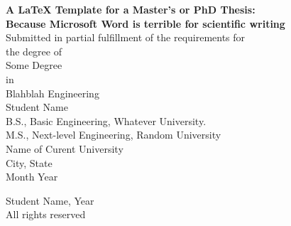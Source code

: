 \thispagestyle{empty}
\begin{center}
\begin{singlespacing}
\vspace*{3\baselineskip}
\textbf{A \LaTeX{}  Template for a Master's or PhD Thesis:\\ \noindent
Because Microsoft Word is terrible for scientific writing\\}
\vspace{4.5\baselineskip}
Submitted in partial fulfillment of the requirements for\\\vspace{0.75\baselineskip}the degree of\\\vspace{0.75\baselineskip}Some Degree\\\vspace{0.75\baselineskip}in\\\vspace{0.75\baselineskip}Blahblah Engineering\\
\vspace{5\baselineskip}
Student Name\\
\vspace{2\baselineskip}
B.S., Basic Engineering, Whatever University.\\
M.S., Next-level Engineering, Random University\\
\vspace{8.5\baselineskip}
Name of Curent University\\
City, State\\
\vspace{\baselineskip}
Month Year
\end{singlespacing}
\end{center}

\newpage
\thispagestyle{empty}
\vspace*{20\baselineskip}
\begin{center}
{\small \textcopyright} Student Name, Year\\All rights reserved
\end{center}